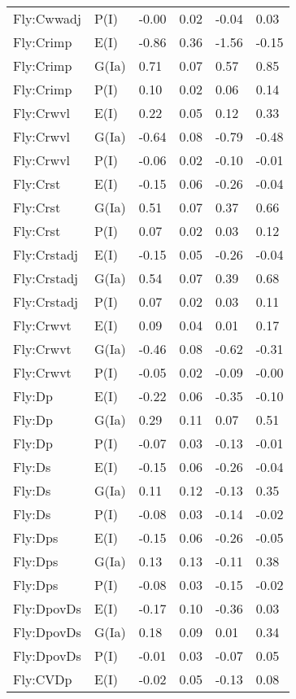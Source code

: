 \begin{center}
\begin{longtable}{|p{1.1in}|p{0.7in}|p{0.7in}|p{0.6in}|p{0.6in}|p{0.6in}|}
  Fly:Cwwadj & P(I) & -0.00 & 0.02 & -0.04 & 0.03 \\ 
  Fly:Crimp & E(I) & -0.86 & 0.36 & -1.56 & -0.15 \\ 
  Fly:Crimp & G(Ia) & 0.71 & 0.07 & 0.57 & 0.85 \\ 
  Fly:Crimp & P(I) & 0.10 & 0.02 & 0.06 & 0.14 \\ 
  Fly:Crwvl & E(I) & 0.22 & 0.05 & 0.12 & 0.33 \\ 
  Fly:Crwvl & G(Ia) & -0.64 & 0.08 & -0.79 & -0.48 \\ 
  Fly:Crwvl & P(I) & -0.06 & 0.02 & -0.10 & -0.01 \\ 
  Fly:Crst & E(I) & -0.15 & 0.06 & -0.26 & -0.04 \\ 
  Fly:Crst & G(Ia) & 0.51 & 0.07 & 0.37 & 0.66 \\ 
  Fly:Crst & P(I) & 0.07 & 0.02 & 0.03 & 0.12 \\ 
  Fly:Crstadj & E(I) & -0.15 & 0.05 & -0.26 & -0.04 \\ 
  Fly:Crstadj & G(Ia) & 0.54 & 0.07 & 0.39 & 0.68 \\ 
  Fly:Crstadj & P(I) & 0.07 & 0.02 & 0.03 & 0.11 \\ 
  Fly:Crwvt & E(I) & 0.09 & 0.04 & 0.01 & 0.17 \\ 
  Fly:Crwvt & G(Ia) & -0.46 & 0.08 & -0.62 & -0.31 \\ 
  Fly:Crwvt & P(I) & -0.05 & 0.02 & -0.09 & -0.00 \\ 
  Fly:Dp & E(I) & -0.22 & 0.06 & -0.35 & -0.10 \\ 
  Fly:Dp & G(Ia) & 0.29 & 0.11 & 0.07 & 0.51 \\ 
  Fly:Dp & P(I) & -0.07 & 0.03 & -0.13 & -0.01 \\ 
  Fly:Ds & E(I) & -0.15 & 0.06 & -0.26 & -0.04 \\ 
  Fly:Ds & G(Ia) & 0.11 & 0.12 & -0.13 & 0.35 \\ 
  Fly:Ds & P(I) & -0.08 & 0.03 & -0.14 & -0.02 \\ 
  Fly:Dps & E(I) & -0.15 & 0.06 & -0.26 & -0.05 \\ 
  Fly:Dps & G(Ia) & 0.13 & 0.13 & -0.11 & 0.38 \\ 
  Fly:Dps & P(I) & -0.08 & 0.03 & -0.15 & -0.02 \\ 
  Fly:DpovDs & E(I) & -0.17 & 0.10 & -0.36 & 0.03 \\ 
  Fly:DpovDs & G(Ia) & 0.18 & 0.09 & 0.01 & 0.34 \\ 
  Fly:DpovDs & P(I) & -0.01 & 0.03 & -0.07 & 0.05 \\ 
  Fly:CVDp & E(I) & -0.02 & 0.05 & -0.13 & 0.08 \\ 

\end{longtable}
\end{center}
